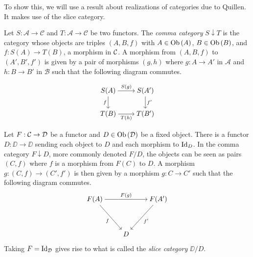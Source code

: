To show this, we will use a result about realizations of categories due to Quillen. It makes use of the slice category.

\begin{definition}
    Let $S : \mathcal{A} \to \mathcal{C}$ and $T : \mathcal{A} \to \mathcal{C}$ be two functors. The \emph{comma category} $S \downarrow T$ is the category whose objects are triples $(A, B, f)$ with $A \in \operatorname{Ob}{\lparen A \rparen}$, $B \in \operatorname{Ob}{\lparen B \rparen}$, and $f : S(A) \to T(B)$, a morphism in $\mathcal{C}$. A morphism from $(A, B, f)$ to $(A', B', f')$ is given by a pair of morphisms $(g,h)$ where $g: A \to A'$ in $\mathcal A$ and $h : B \to B'$ in $\mathcal B$ such that the following diagram commutes.

    \[\begin{tikzcd}[ampersand replacement=\&,cramped]
        {S(A)} \& {S(A')} \\
        {T(B)} \& {T(B')}
        \arrow["{S(g)}", from=1-1, to=1-2]
        \arrow["f"', from=1-1, to=2-1]
        \arrow["{f'}", from=1-2, to=2-2]
        \arrow["{T(h)}"', from=2-1, to=2-2]
    \end{tikzcd}\]
\end{definition}

\begin{example}
    Let $F : \mathcal{C} \to \mathcal{D}$ be a functor and $D \in \operatorname{Ob}{\lparen \mathcal{D} \rparen}$ be a fixed object. There is a functor $D : \DD \to \DD$ sending each object to $D$ and each morphism to $\textnormal{Id}_{D}$. In the comma category $F\downarrow D$, more commonly denoted $F / D$, the objects can be seen as pairs $(C, f)$ where $f$ is a morphism from $F(C)$ to $D$. A morphism $g : (C, f) \to (C', f')$ is then given by a morphism $g : C \to C'$ such that the following diagram commutes.
    \[\begin{tikzcd}[ampersand replacement=\&,cramped]
        {F(A)} \&\& {F(A')} \\
        \\
        \& D
        \arrow["{F(g)}", from=1-1, to=1-3]
        \arrow["f"', from=1-1, to=3-2]
        \arrow["{f'}", from=1-3, to=3-2]
    \end{tikzcd}\]
    
    
    Taking $F = \textnormal{Id}_{\mathcal{D}}$ gives rise to what is called the \emph{slice category} $\DD/D$.
\end{example}

